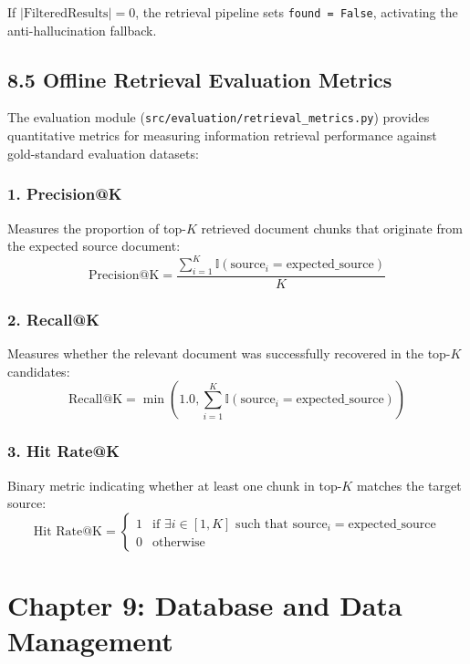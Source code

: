 \documentclass[
]{article}
\begin{document}
If \(|\text{FilteredResults}| = 0\), the retrieval pipeline sets
\texttt{found\ \allowbreak =\allowbreak \ \allowbreak False}, activating the anti-hallucination fallback.

\subsection{8.5 Offline Retrieval Evaluation
Metrics}\label{offline-retrieval-evaluation-metrics}

The evaluation module (\texttt{src/\allowbreak evaluation/\allowbreak retrieval\_\allowbreak metrics.\allowbreak py})
provides quantitative metrics for measuring information retrieval
performance against gold-standard evaluation datasets:

\subsubsection{1. Precision@K}\label{precisionk}

Measures the proportion of top-\(K\) retrieved document chunks that
originate from the expected source document:
\[\text{Precision@K} = \frac{\sum_{i=1}^K \mathbb{I}(\text{source}_i = \text{expected\_source})}{K}\]

\subsubsection{2. Recall@K}\label{recallk}

Measures whether the relevant document was successfully recovered in the
top-\(K\) candidates:
\[\text{Recall@K} = \min\left(1.0, \sum_{i=1}^K \mathbb{I}(\text{source}_i = \text{expected\_source})\right)\]

\subsubsection{3. Hit Rate@K}\label{hit-ratek}

Binary metric indicating whether at least one chunk in top-\(K\) matches
the target source:
\[\text{Hit Rate@K} = \begin{cases} 1 & \text{if } \exists i \in [1, K] \text{ such that } \text{source}_i = \text{expected\_source} \\ 0 & \text{otherwise} \end{cases}\]

\section{Chapter 9: Database and Data
Management}\label{chapter-9-database-and-data-management}
\end{document}
